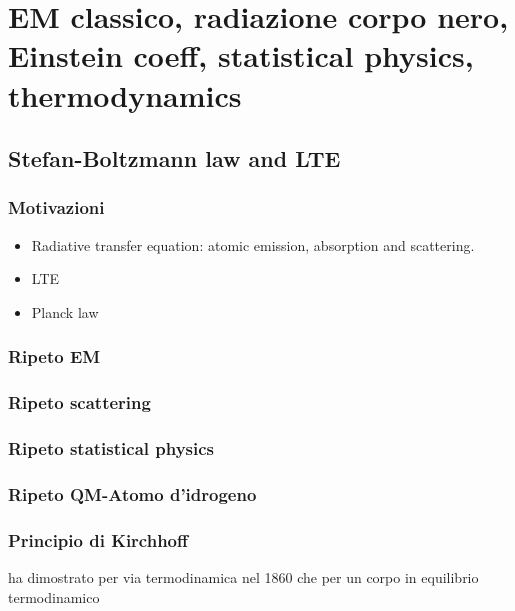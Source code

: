 \documentclass[main.tex]{subfiles}
\begin{document}
\part{EM classico, radiazione corpo nero, Einstein coeff, statistical physics, thermodynamics}
\chapter{Stefan-Boltzmann law and LTE}
\section{Motivazioni}
\begin{itemize}
    \item Radiative transfer equation: atomic emission, absorption and scattering.
    \item LTE
     \item Planck law
\end{itemize}
\section{Ripeto EM}

\section{Ripeto scattering}


\section{Ripeto statistical physics}

\section{Ripeto QM-Atomo d'idrogeno}

\section{Principio di Kirchhoff}
\khhff{} ha dimostrato per via termodinamica nel 1860 che per un corpo in equilibrio termodinamico
\end{document}
